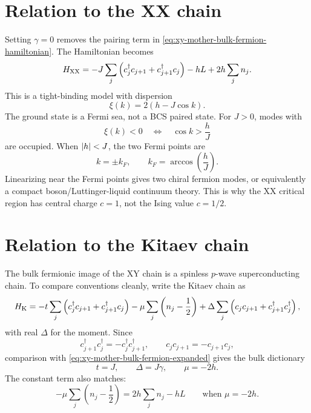 \section{Relation to the XX chain}
\label{sec:xy-relation-to-xx}

Setting $\gamma=0$ removes the pairing term in
\cref{eq:xy-mother-bulk-fermion-hamiltonian}.  The Hamiltonian becomes
\begin{equation}
\label{eq:xy-mother-xx-fermion-hamiltonian}
    H_{\rm XX}
    =
    -J\sum_j
    \left(
        c_j^\dagger c_{j+1}+c_{j+1}^\dagger c_j
    \right)
    -hL+2h\sum_j n_j.
\end{equation}
This is a tight-binding model with dispersion
\begin{equation}
\label{eq:xy-mother-xx-tight-binding-dispersion}
    \xi(k)=2(h-J\cos k).
\end{equation}
The ground state is a Fermi sea, not a BCS paired state.  For $J>0$, modes with
\begin{equation}
    \xi(k)<0
    \quad\Longleftrightarrow\quad
    \cos k>\frac{h}{J}
\end{equation}
are occupied.  When $\left|h\right|<J$, the two Fermi points are
\begin{equation}
\label{eq:xy-mother-xx-fermi-momenta}
    k=\pm k_F,
    \qquad
    k_F=\arccos\left(\frac{h}{J}\right).
\end{equation}
Linearizing near the Fermi points gives two chiral fermion modes, or equivalently
a compact boson/Luttinger-liquid continuum theory.  This is why the XX critical
region has central charge $c=1$, not the Ising value $c=1/2$.

\section{Relation to the Kitaev chain}
\label{sec:xy-relation-to-kitaev-chain}

The bulk fermionic image of the XY chain is a spinless $p$-wave superconducting
chain.  To compare conventions cleanly, write the Kitaev chain as
\begin{equation}
\label{eq:xy-mother-kitaev-convention-annihilation}
    H_{\rm K}
    =
    -t\sum_j
    \left(
        c_j^\dagger c_{j+1}+c_{j+1}^\dagger c_j
    \right)
    -\mu\sum_j\left(n_j-\frac12\right)
    +\Delta\sum_j
    \left(
        c_jc_{j+1}+c_{j+1}^\dagger c_j^\dagger
    \right),
\end{equation}
with real $\Delta$ for the moment.  Since
\begin{equation}
    c_{j+1}^\dagger c_j^\dagger=-c_j^\dagger c_{j+1}^\dagger,
    \qquad
    c_jc_{j+1}=-c_{j+1}c_j,
\end{equation}
comparison with \cref{eq:xy-mother-bulk-fermion-expanded} gives the bulk
dictionary
\begin{equation}
\label{eq:xy-mother-kitaev-dictionary}
    t=J,
    \qquad
    \Delta=J\gamma,
    \qquad
    \mu=-2h.
\end{equation}
The constant term also matches:
\begin{equation}
    -\mu\sum_j\left(n_j-\frac12\right)
    =
    2h\sum_j n_j-hL
    \qquad
    \text{when } \mu=-2h.
\end{equation}

